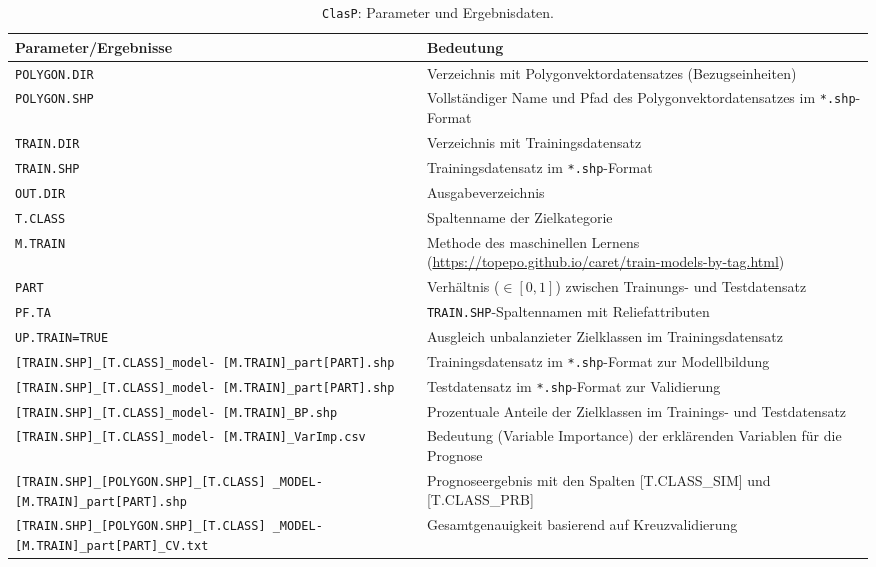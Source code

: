 \begin{table}[p]
	\caption{\texttt{ClasP}: Parameter und Ergebnisdaten.}
	\centering
	\begin{tabularx}{\textwidth}{X|X}
		\toprule
		\textbf{Parameter/Ergebnisse} & \textbf{Bedeutung} \\
		\midrule
		\texttt{POLYGON.DIR} & Verzeichnis mit Polygonvektordatensatzes (Bezugseinheiten) \\ \midrule
		\texttt{POLYGON.SHP} & Vollständiger Name und Pfad des Polygonvektordatensatzes im \texttt{*.shp}-Format\\ \midrule
		\texttt{TRAIN.DIR} & Verzeichnis mit Trainingsdatensatz\\\midrule
		\texttt{TRAIN.SHP} & Trainingsdatensatz  im \texttt{*.shp}-Format\\\midrule
		\texttt{OUT.DIR} & Ausgabeverzeichnis \\\midrule
		\texttt{T.CLASS} & Spaltenname der Zielkategorie\\\midrule
		\texttt{M.TRAIN} & Methode des maschinellen Lernens (\url{https://topepo.github.io/caret/train-models-by-tag.html})\\\midrule
		\texttt{PART} & Verhältnis ($\in[0,1]$) zwischen Trainungs- und Testdatensatz\\\midrule
		\texttt{PF.TA} & \texttt{TRAIN.SHP}-Spaltennamen mit Reliefattributen\\\midrule
		\texttt{UP.TRAIN=TRUE} &  Ausgleich unbalanzieter Zielklassen im Trainingsdatensatz\\\midrule\midrule
		\texttt{[TRAIN.SHP]\_[T.CLASS]\_model- [M.TRAIN]\_part[PART].shp} & Trainingsdatensatz im \texttt{*.shp}-Format zur Modellbildung\\\midrule
		\texttt{[TRAIN.SHP]\_[T.CLASS]\_model- [M.TRAIN]\_part[PART].shp} & Testdatensatz im \texttt{*.shp}-Format zur Validierung\\\midrule
		\texttt{[TRAIN.SHP]\_[T.CLASS]\_model- [M.TRAIN]\_BP.shp} & Prozentuale Anteile der Zielklassen im Trainings- und Testdatensatz\\\midrule
		\texttt{[TRAIN.SHP]\_[T.CLASS]\_model- [M.TRAIN]\_VarImp.csv} & Bedeutung (Variable Importance) der erklärenden Variablen für die Prognose\\\midrule
		\texttt{[TRAIN.SHP]\_[POLYGON.SHP]\_[T.CLASS] \_MODEL-[M.TRAIN]\_part[PART].shp} & Prognoseergebnis mit den Spalten [T.CLASS\_SIM] und [T.CLASS\_PRB]\\\midrule
		\texttt{[TRAIN.SHP]\_[POLYGON.SHP]\_[T.CLASS] \_MODEL-[M.TRAIN]\_part[PART]\_CV.txt} & Gesamtgenauigkeit basierend auf Kreuzvalidierung\\\midrule

\end{tabularx}
\end{table}
